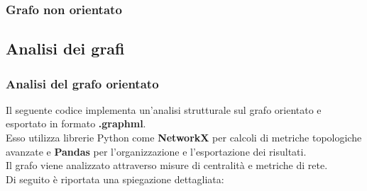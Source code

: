 \documentclass[12pt]{article}
\begin{document}
	\subsubsection{Grafo non orientato}
	\subsection{Analisi dei grafi}
	\subsubsection{Analisi del grafo orientato}
	Il seguente codice implementa un’analisi strutturale sul grafo orientato e esportato in formato \textbf{.graphml}. \\Esso utilizza librerie Python come \textbf{NetworkX} per calcoli di metriche topologiche avanzate e \textbf{Pandas} per l’organizzazione e l’esportazione dei risultati. \\ Il grafo viene analizzato attraverso misure di centralità e metriche di rete. \\Di seguito è riportata una spiegazione dettagliata:
\end{document}
